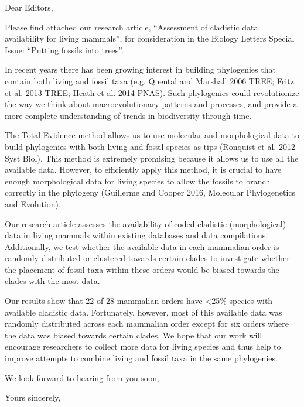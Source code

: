 \documentclass[11pt]{letter}
\begin{document}
\begin{letter}{}
\opening{Dear Editors,}

Please find attached our research article, ``Assessment of cladistic data availability for living mammals'', for consideration in the Biology Letters Special Issue: ``Putting fossils into trees''.%


In recent years there has been growing interest in building phylogenies that contain both living and fossil taxa (e.g. Quental and Marshall 2006 TREE; Fritz et al. 2013 TREE; Heath et al. 2014 PNAS).
Such phylogenies could revolutionize the way we think about macroevolutionary patterns and processes, and provide a more complete understanding of trends in biodiversity through time.

The Total Evidence method allows us to use molecular and morphological data to build phylogenies with both living and fossil species as tips (Ronquist et al. 2012 Syst Biol).
This method is extremely promising because it allows us to use all the available data. 
However, to efficiently apply this method, it is crucial to have enough morphological data for living species to allow the fossils to branch correctly in the phylogeny (Guillerme and Cooper 2016, Molecular Phylogenetics and Evolution).

Our research article assesses the availability of coded cladistic (morphological) data in living mammals within existing databases and data compilations.
Additionally, we test whether the available data in each mammalian order is randomly distributed or clustered towards certain clades to investigate whether the placement of fossil taxa within these orders would be biased towards the clades with the most data.

Our results show that 22 of 28 mammalian orders have \textless 25\% species with available cladistic data.
Fortunately, however, most of this available data was randomly distributed across each mammalian order except for six orders where the data was biased towards certain clades.
We hope that our work will encourage researchers to collect more data for living species and thus help to improve attempts to combine living and fossil taxa in the same phylogenies.

We look forward to hearing from you soon,


\closing{Yours sincerely,}


\end{letter}
\end{document}
